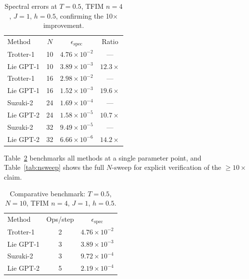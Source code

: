 \documentclass[aps,prxquantum,twocolumn,nofootinbib]{revtex4-2}
\begin{document}
\begin{table}[t]
  \caption{Spectral errors at $T=0.5$, TFIM $n=4$, $J=1$, $h=0.5$,
    confirming the 10$\times$ improvement.}
  \label{tab:tfim-n10}
  \begin{ruledtabular}
    \small
    \begin{tabular}{lccc}
      Method & $N$ & $\epsilon_{\mathrm{spec}}$ & Ratio \\
      \colrule
      Trotter-1   & 10 & $4.76\times10^{-2}$ & --- \\
      Lie GPT-1   & 10 & $3.89\times10^{-3}$ & $12.3\times$ \\
      Trotter-1   & 16 & $2.98\times10^{-2}$ & --- \\
      Lie GPT-1   & 16 & $1.52\times10^{-3}$ & $19.6\times$ \\
      \colrule
      Suzuki-2    & 24 & $1.69\times10^{-4}$ & --- \\
      Lie GPT-2   & 24 & $1.58\times10^{-5}$ & $10.7\times$ \\
      Suzuki-2    & 32 & $9.49\times10^{-5}$ & --- \\
      Lie GPT-2   & 32 & $6.66\times10^{-6}$ & $14.2\times$ \\
    \end{tabular}
  \end{ruledtabular}
\end{table}

Table~\ref{tab:tfim-selected} benchmarks all methods at a single
parameter point, and Table~\ref{tab:nsweep} shows the full $N$-sweep
for explicit verification of the $\geq10\times$ claim.

\begin{table}[t]
  \caption{Comparative benchmark: $T=0.5$, $N=10$, TFIM $n=4$, $J=1$, $h=0.5$.}
  \label{tab:tfim-selected}
  \begin{ruledtabular}
    \small
    \begin{tabular}{lcc}
      Method              & Ops/step & $\epsilon_{\mathrm{spec}}$ \\
      \colrule
      Trotter-1           & 2 & $4.76\times10^{-2}$ \\
      Lie GPT-1           & 3 & $3.89\times10^{-3}$ \\
      Suzuki-2            & 3 & $9.72\times10^{-4}$ \\
      Lie GPT-2           & 5 & $2.19\times10^{-4}$ \\
    \end{tabular}
  \end{ruledtabular}
\end{table}
\end{document}
